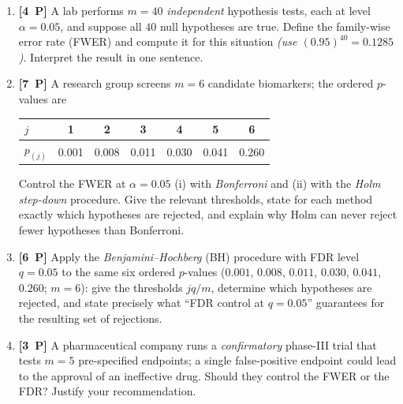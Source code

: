 \documentclass[11pt,a4paper]{article}
\newcommand{\pp}[1]{\textbf{[#1~P]}\enspace}
\begin{document}
\begin{enumerate}[label=(\alph*),leftmargin=7mm,itemsep=2.5mm]
  \item \pp{4} A lab performs $m=40$ \emph{independent} hypothesis tests, each at level
    $\alpha=0.05$, and suppose all $40$ null hypotheses are true. Define the family-wise error
    rate (FWER) and compute it for this situation \emph{(use $(0.95)^{40}=0.1285$)}. Interpret
    the result in one sentence.
  \item \pp{7} A research group screens $m=6$ candidate biomarkers; the ordered $p$-values are
    \begin{center}
    \begin{tabular}{lcccccc}
    \toprule
    $j$ & 1 & 2 & 3 & 4 & 5 & 6\\
    \midrule
    $p_{(j)}$ & 0.001 & 0.008 & 0.011 & 0.030 & 0.041 & 0.260\\
    \bottomrule
    \end{tabular}
    \end{center}
    Control the FWER at $\alpha=0.05$ (i) with \emph{Bonferroni} and (ii) with the
    \emph{Holm step-down} procedure. Give the relevant thresholds, state for each method
    exactly which hypotheses are rejected, and explain why Holm can never reject fewer
    hypotheses than Bonferroni.
  \item \pp{6} Apply the \emph{Benjamini--Hochberg} (BH) procedure with FDR level $q=0.05$ to
    the same six ordered $p$-values ($0.001$, $0.008$, $0.011$, $0.030$, $0.041$, $0.260$;
    $m=6$): give the thresholds $jq/m$, determine which hypotheses are rejected, and state
    precisely what ``FDR control at $q=0.05$'' guarantees for the resulting set of rejections.
  \item \pp{3} A pharmaceutical company runs a \emph{confirmatory} phase-III trial that tests
    $m=5$ pre-specified endpoints; a single false-positive endpoint could lead to the approval
    of an ineffective drug. Should they control the FWER or the FDR? Justify your
    recommendation.
\end{enumerate}
\end{document}
